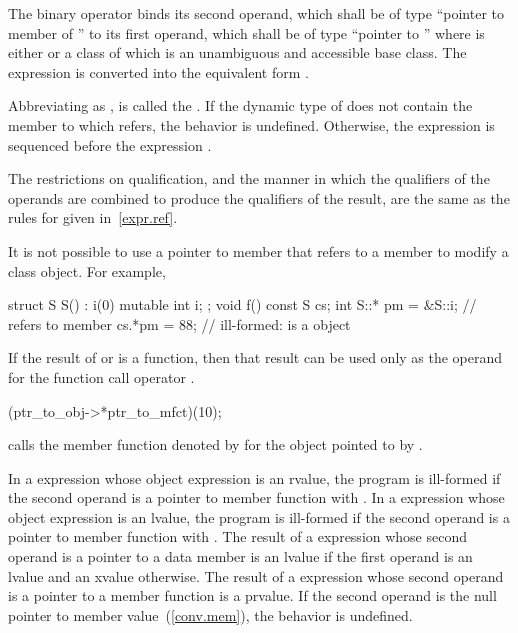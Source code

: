\pnum
The binary operator \tcode{->*} binds its second operand, which shall be
of type ``pointer to member of '' to its first operand, which shall be of
type ``pointer to ''
where  is either  or
a class of which 
is an unambiguous and accessible base class.
The expression  is converted into the equivalent form
.

\pnum
Abbreviating  as , 
is called the .
If the dynamic type of  does not
contain the member to which
 refers, the behavior is undefined.
Otherwise, the expression  is sequenced before the expression .

\pnum
The restrictions on qualification, and the manner in which
the qualifiers of the operands are combined to produce the
qualifiers of the result, are the same as the rules for
 given in~\ref{expr.ref}.
\begin{note}
It is not possible to use a pointer to member that refers to a
 member to modify a  class object. For
example,

\begin{codeblock}
struct S {
  S() : i(0) { }
  mutable int i;
};
void f()
{
const S cs;
int S::* pm = &S::i;            //  refers to  member 
cs.*pm = 88;                    // ill-formed:  is a  object
}
\end{codeblock}
\end{note}

\pnum
{}%
If the result of  or \tcode{->*} is a function, then that
result can be used only as the operand for the function call operator
\tcode{()}.
\begin{example}

\begin{codeblock}
(ptr_to_obj->*ptr_to_mfct)(10);
\end{codeblock}

calls the member function denoted by  for the object
pointed to by .
\end{example}
In a  expression whose object expression is an rvalue, the program is
ill-formed if the second operand is a pointer to member function with
 \tcode{\&}.
In a 
expression whose object expression is an lvalue, the program is ill-formed if the second
operand is a pointer to member function with  \tcode{\&\&}.
The result of a  expression
whose second operand is a pointer to a data member is an lvalue if the first
operand is an lvalue and an xvalue otherwise. The result of a  expression whose
second operand is a pointer to a member function is a prvalue.
If the second operand is the null
pointer to member value~(\ref{conv.mem}), the behavior is undefined.

